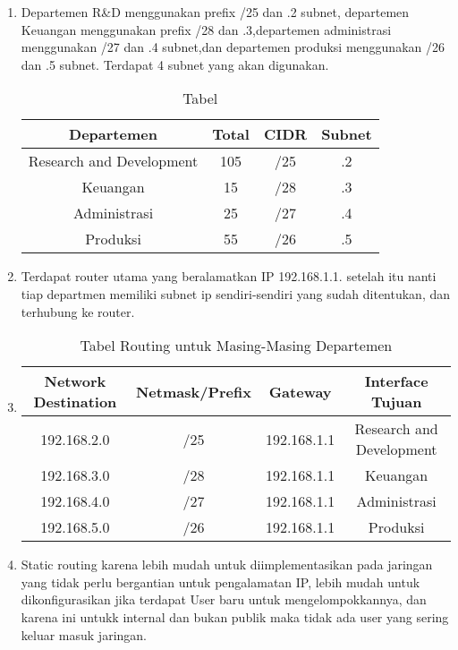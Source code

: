 \begin{enumerate}
    \item Departemen R&D menggunakan prefix /25 dan .2 subnet,
    departemen Keuangan menggunakan prefix /28 dan .3,departemen
    administrasi menggunakan /27 dan .4 subnet,dan departemen produksi menggunakan /26 dan .5 subnet. 
    Terdapat 4 subnet yang akan digunakan.
    \begin{table}[h!]
        \centering
        \begin{tabular}{|c|c|c|c|}
        \hline
        \textbf{Departemen} & \textbf{Total} & \textbf{CIDR} & \textbf{Subnet}\\
        \hline
        Research and Development & 105 & /25  & .2\\
        Keuangan & 15 & /28 & .3 \\
        Administrasi & 25 & /27 & .4\\
        Produksi & 55 & /26 & .5 \\
        \hline
        \end{tabular}
        \caption{Tabel }
        \label{tab:routing}
        \end{table}
    \item Terdapat router utama yang beralamatkan IP 192.168.1.1.  setelah itu nanti tiap
    departmen memiliki subnet ip sendiri-sendiri yang sudah ditentukan, dan terhubung ke router.
    \item \begin{table}[h!]
    \centering
    \begin{tabular}{|c|c|c|c|}
    \hline
    \textbf{Network Destination} & \textbf{Netmask/Prefix} & \textbf{Gateway} & \textbf{Interface Tujuan} \\
    \hline
    192.168.2.0 & /25 & 192.168.1.1 & Research and Development \\
    192.168.3.0 & /28 & 192.168.1.1 & Keuangan \\
    192.168.4.0 & /27 & 192.168.1.1 & Administrasi \\
    192.168.5.0 & /26 & 192.168.1.1 & Produksi \\
    \hline
    \end{tabular}
    \caption{Tabel Routing untuk Masing-Masing Departemen}
    \label{tab:routing}
    \end{table}      
    \item Static routing karena lebih mudah untuk diimplementasikan pada jaringan yang tidak perlu bergantian
    untuk pengalamatan IP, lebih mudah untuk dikonfigurasikan jika terdapat User baru untuk mengelompokkannya,
    dan karena ini untukk internal dan bukan publik maka tidak ada user yang sering keluar masuk jaringan.

\end{enumerate}


